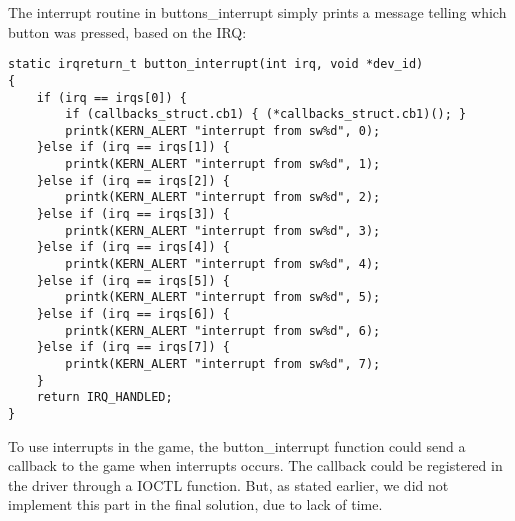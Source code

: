 The interrupt routine in buttons\_interrupt simply prints a message telling which button was pressed, based on the IRQ:
\begin{lstlisting}
static irqreturn_t button_interrupt(int irq, void *dev_id)
{
	if (irq == irqs[0]) {
		if (callbacks_struct.cb1) { (*callbacks_struct.cb1)(); }
		printk(KERN_ALERT "interrupt from sw%d", 0);
	}else if (irq == irqs[1]) {
		printk(KERN_ALERT "interrupt from sw%d", 1);
	}else if (irq == irqs[2]) {
		printk(KERN_ALERT "interrupt from sw%d", 2);
	}else if (irq == irqs[3]) {
		printk(KERN_ALERT "interrupt from sw%d", 3);
	}else if (irq == irqs[4]) {
		printk(KERN_ALERT "interrupt from sw%d", 4);
	}else if (irq == irqs[5]) {
		printk(KERN_ALERT "interrupt from sw%d", 5);
	}else if (irq == irqs[6]) {
		printk(KERN_ALERT "interrupt from sw%d", 6);
	}else if (irq == irqs[7]) {
		printk(KERN_ALERT "interrupt from sw%d", 7);
	}
	return IRQ_HANDLED;
}
\end{lstlisting}

To use interrupts in the game, the button\_interrupt function could send a callback to the game when interrupts occurs. The callback could be registered in the driver through a IOCTL function. But, as stated earlier, we did not implement this part in the final solution, due to lack of time.
